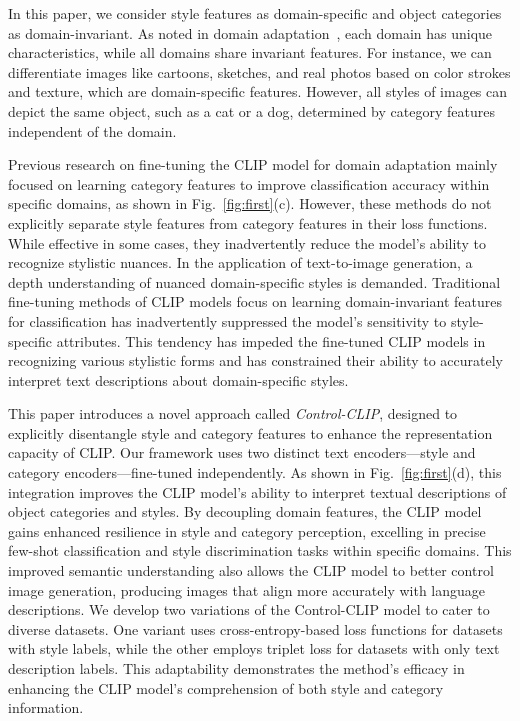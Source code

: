 In this paper, we consider style features as domain-specific and object categories as domain-invariant. As noted in domain adaptation~\cite{wang2018deep}, each domain has unique characteristics, while all domains share invariant features. For instance, we can differentiate images like cartoons, sketches, and real photos based on color strokes and texture, which are domain-specific features. However, all styles of images can depict the same object, such as a cat or a dog, determined by category features independent of the domain.

Previous research on fine-tuning the CLIP model for domain adaptation mainly focused on learning category features to improve classification accuracy within specific domains, as shown in Fig.~\ref{fig:first}(c). However, these methods do not explicitly separate style features from category features in their loss functions. While effective in some cases, they inadvertently reduce the model's ability to recognize stylistic nuances. In the application of text-to-image generation, a depth understanding of nuanced domain-specific styles is demanded. Traditional fine-tuning methods of CLIP models focus on learning domain-invariant features for classification has inadvertently suppressed the model's sensitivity to style-specific attributes. This tendency has impeded the fine-tuned CLIP models in recognizing various stylistic forms and has constrained their ability to accurately interpret text descriptions about domain-specific styles.

This paper introduces a novel approach called \emph{Control-CLIP}, designed to explicitly disentangle style and category features to enhance the representation capacity of CLIP. Our framework uses two distinct text encoders—style and category encoders—fine-tuned independently. As shown in Fig.~\ref{fig:first}(d), this integration improves the CLIP model's ability to interpret textual descriptions of object categories and styles. By decoupling domain features, the CLIP model gains enhanced resilience in style and category perception, excelling in precise few-shot classification and style discrimination tasks within specific domains. This improved semantic understanding also allows the CLIP model to better control image generation, producing images that align more accurately with language descriptions. We develop two variations of the Control-CLIP model to cater to diverse datasets. One variant uses cross-entropy-based loss functions for datasets with style labels, while the other employs triplet loss for datasets with only text description labels. This adaptability demonstrates the method's efficacy in enhancing the CLIP model's comprehension of both style and category information.

